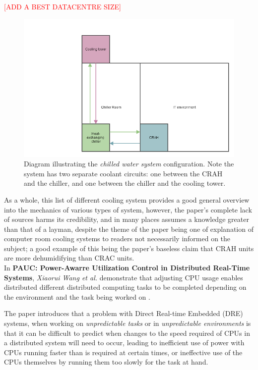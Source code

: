 \textcolor{red}{[ADD A BEST DATACENTRE SIZE]}

\begin{figure}[H]
   \centering
   \includegraphics[width=5in]{Resources//ChilledWaterCRAHSystemDiagram.png}
   \caption{Diagram illustrating the \emph{chilled water system} configuration. Note the system has two separate coolant circuits: one between the \gls{CRAH} and the chiller, and one between the chiller and the cooling tower.}
   \label{fig:ChilledWaterCRAHSystemDiagram}
\end{figure}

As a whole, this list of different cooling system provides a good general overview into the mechanics of various types of system, however, the paper's complete lack of sources harms its credibility, and in many places assumes a knowledge greater than that of a layman, despite the theme of the paper being one of explanation of computer room cooling systems to readers not necessarily informed on the subject; a good example of this being the paper's baseless claim that \gls{CRAH} units are more dehumidifying than \gls{CRAC} units.
\\

In \textbf{PAUC: Power-Awarre Utilization Control in Distributed Real-Time Systems}, \emph{Xiaorui Wang et al.}  demonstrate that adjusting CPU usage enables distributed different distributed computing tasks to be completed depending on the environment and the task being worked on \cite{PAUCPower-AwareUtilizationControlInDistributedRealTimeSystems}.

The paper introduces that a problem with Direct Real-time Embedded (DRE) systems, when working on \emph{unpredictable tasks} or in \emph{unpredictable environments} is that it can be difficult to predict when changes to the speed required of CPUs in a distributed system will need to occur, leading to inefficient use of power with CPUs running faster than is required at certain times, or ineffective use of the CPUs themselves by running them too slowly for the task at hand.

